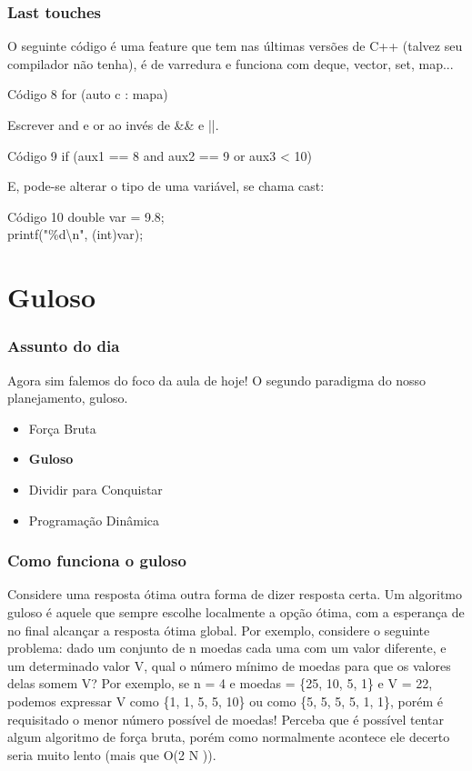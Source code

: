 \documentclass{beamer}
\begin{document}
	\begin{frame}
	\frametitle{Last touches}
		O seguinte código é uma feature que tem nas últimas
		versões de C++ (talvez seu compilador não tenha), é de
		varredura e funciona com deque, vector, set, map...
		\begin{block}{Código 8}
		\hspace{10 pt} for (auto c : mapa)
		\end{block}
		Escrever and e or ao invés de \&\& e ||.
		\begin{block}{Código 9}
		\hspace{10 pt} if (aux1 == 8 and aux2 == 9 or aux3 < 10)
		\end{block}
		E, pode-se alterar o tipo de uma variável, se chama cast:
		\begin{block}{Código 10}
		\hspace{10 pt} double var = 9.8;\\
		\hspace{10 pt} printf("\%d\textbackslash n", (int)var);
		\end{block}
	\end{frame}

	\section{Guloso}

	\begin{frame}
	\frametitle{Assunto do dia}
		Agora sim falemos do foco da aula de hoje! O segundo
		paradigma do nosso planejamento, guloso.
		\begin{itemize}
			\item Força Bruta
			\item \textbf{Guloso}
			\item Dividir para Conquistar
			\item Programação Dinâmica
		\end{itemize}
	\end{frame}

	\begin{frame}
	\frametitle{Como funciona o guloso}
		Considere uma resposta ótima outra forma de dizer
		resposta certa. Um algoritmo guloso é aquele que sempre
		escolhe localmente a opção ótima, com a esperança de no final
		alcançar a resposta ótima global. Por exemplo, considere o
		seguinte problema: dado um conjunto de n moedas cada uma
		com um valor diferente, e um determinado valor V, qual o
		número mínimo de moedas para que os valores delas somem V?
		Por exemplo, se n = 4 e moedas = \{25, 10, 5, 1\} e V = 22,
		podemos expressar V como \{1, 1, 5, 5, 10\} ou como \{5, 5, 5,
		5, 1, 1\}, porém é requisitado o menor número possível de
		moedas! Perceba que é possível tentar algum algoritmo de força
		bruta, porém como normalmente acontece ele decerto seria
		muito lento (mais que O(2 N )).
	\end{frame}
\end{document}
